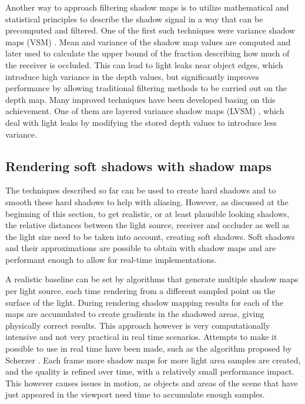 Another way to approach filtering shadow maps is to utilize mathematical and statistical principles to describe the shadow signal in a way that can be precomputed and filtered. One of the first such techniques were variance shadow maps (VSM) \cite{bib:proc:donnelly_vsm}. Mean and variance of the shadow map values are computed and later used to calculate the upper bound of the fraction describing how much of the receiver is occluded. This can lead to light leaks near object edges, which introduce high variance in the depth values, but significantly improves performance by allowing traditional filtering methods to be carried out on the depth map. Many improved techniques have been developed basing on this achievement. One of them are layered variance shadow maps (LVSM) \cite{bib:proc:lauritzen_lvsm}, which deal with light leaks by modifying the stored depth values to introduce less variance.

\subsection{Rendering soft shadows with shadow maps}
\label{section:soft_shadow_maps}
The techniques described so far can be used to create hard shadows and to smooth these hard shadows to help with aliasing. However, as discussed at the beginning of this section, to get realistic, or at least plausible looking shadows, the relative distances between the light source, receiver and occluder as well as the light size need to be taken into account, creating soft shadows. Soft shadows and their approximations are possible to obtain with shadow maps and are performant enough to allow for real-time implementations.

A realistic baseline can be set by algorithms that generate multiple shadow maps per light source, each time rendering from a different sampled point on the surface of the light. During rendering shadow mapping results for each of the maps are accumulated to create gradients in the shadowed areas, giving physically correct results. This approach however is very computationally intensive and not very practical in real time scenarios. Attempts to make it possible to use in real time have been made, such as the algorithm proposed by Scherzer \cite{bib:proc:scherzer_soft_temporal_shadows}. Each frame more shadow maps for more light area samples are created, and the quality is refined over time, with a relatively small performance impact. This however causes issues in motion, as objects and areas of the scene that have just appeared in the viewport need time to accumulate enough samples.

